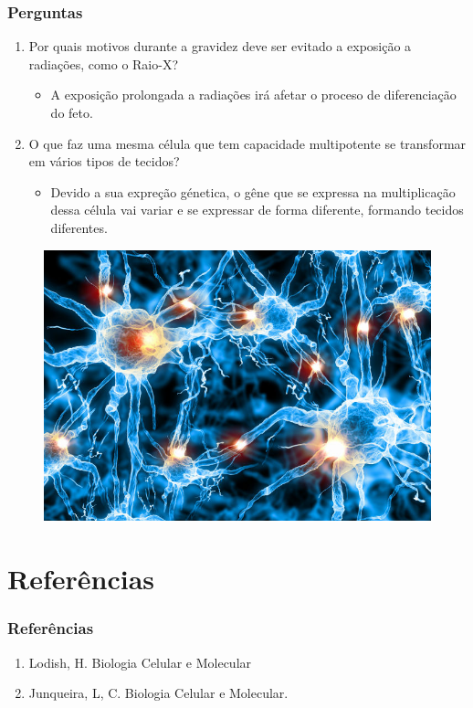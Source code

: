 \documentclass[brazil]{beamer}
\begin{document}
\begin{frame}
  \frametitle{Perguntas}
  \begin{enumerate}
    \item Por quais motivos durante a gravidez deve ser evitado a exposição a radiações, como o Raio-X?
    \pause
    \begin{itemize}
     \item A exposição prolongada a radiações irá afetar o proceso de diferenciação do feto. 
    \end{itemize}

    \item O que faz uma mesma célula que tem capacidade multipotente se transformar em vários tipos de tecidos? 
    \pause 
    \begin{itemize}
     \item Devido a sua expreção génetica, o gêne que se expressa na multiplicação dessa célula vai variar e se expressar de forma diferente, formando tecidos diferentes. 
    \end{itemize}

    \end{enumerate}
  \begin{figure}
     \includegraphics[scale=0.2]{perguntas.jpg}
  \end{figure}

\end{frame}

\section{Referências}
\begin{frame}
 \frametitle{Referências}
 \tiny
      \begin{enumerate}[1]
      \item Lodish, H. Biologia Celular e Molecular
      \item Junqueira, L, C. Biologia Celular e Molecular. 
      \end{enumerate}
\end{frame}
\end{document}
